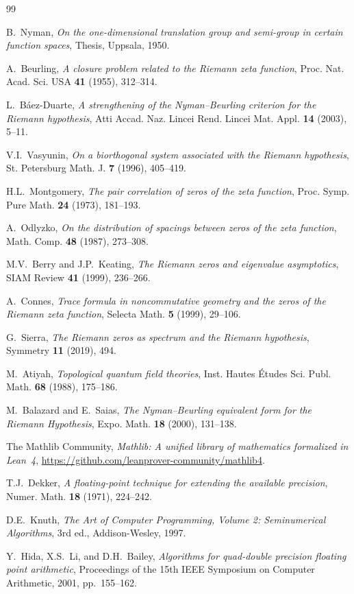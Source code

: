 \documentclass[11pt,a4paper]{article}
\begin{document}
\begin{thebibliography}{99}

B.~Nyman, \emph{On the one-dimensional translation group and semi-group in
certain function spaces}, Thesis, Uppsala, 1950.

A.~Beurling, \emph{A closure problem related to the Riemann zeta function},
Proc. Nat. Acad. Sci. USA \textbf{41} (1955), 312--314.

L.~B\'aez-Duarte, \emph{A strengthening of the Nyman--Beurling criterion for
the Riemann hypothesis}, Atti Accad. Naz. Lincei Rend. Lincei Mat. Appl.
\textbf{14} (2003), 5--11.

V.I.~Vasyunin, \emph{On a biorthogonal system associated with the Riemann
hypothesis}, St. Petersburg Math. J. \textbf{7} (1996), 405--419.

H.L.~Montgomery, \emph{The pair correlation of zeros of the zeta function},
Proc. Symp. Pure Math. \textbf{24} (1973), 181--193.

A.~Odlyzko, \emph{On the distribution of spacings between zeros of the zeta
function}, Math. Comp. \textbf{48} (1987), 273--308.

M.V.~Berry and J.P.~Keating, \emph{The Riemann zeros and eigenvalue
asymptotics}, SIAM Review \textbf{41} (1999), 236--266.

A.~Connes, \emph{Trace formula in noncommutative geometry and the zeros of
the Riemann zeta function}, Selecta Math. \textbf{5} (1999), 29--106.

G.~Sierra, \emph{The Riemann zeros as spectrum and the Riemann hypothesis},
Symmetry \textbf{11} (2019), 494.

M.~Atiyah, \emph{Topological quantum field theories}, Inst. Hautes \'Etudes
Sci. Publ. Math. \textbf{68} (1988), 175--186.

M.~Balazard and E.~Saias, \emph{The Nyman--Beurling equivalent form for the
Riemann Hypothesis}, Expo. Math. \textbf{18} (2000), 131--138.

The Mathlib Community, \emph{Mathlib: A unified library of mathematics
formalized in Lean~4}, \url{https://github.com/leanprover-community/mathlib4}.

T.J.~Dekker, \emph{A floating-point technique for extending the available
precision}, Numer. Math. \textbf{18} (1971), 224--242.

D.E.~Knuth, \emph{The Art of Computer Programming, Volume 2: Seminumerical
Algorithms}, 3rd ed., Addison-Wesley, 1997.

Y.~Hida, X.S.~Li, and D.H.~Bailey, \emph{Algorithms for quad-double precision
floating point arithmetic}, Proceedings of the 15th IEEE Symposium on
Computer Arithmetic, 2001, pp.~155--162.

\end{thebibliography}
\end{document}
